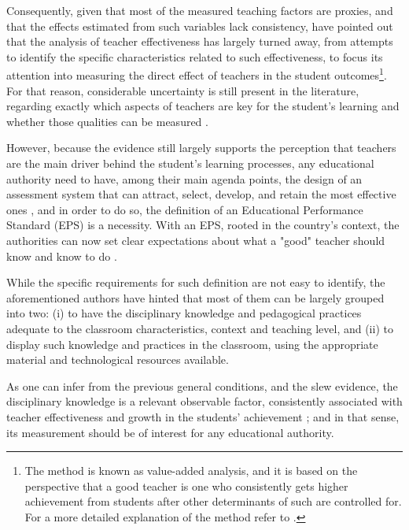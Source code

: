 Consequently, given that most of the measured teaching factors are proxies, and that the effects estimated from such variables lack consistency, \citet{Hanushek_et_al_2012} have pointed out that the analysis of teacher effectiveness has largely turned away, from attempts to identify the specific characteristics related to such effectiveness, to focus its attention into measuring the direct effect of teachers in the student outcomes\footnote{The method is known as value-added analysis, and it is based on the perspective that a good teacher is one who consistently gets higher achievement from students after other determinants of such are controlled for. For a more detailed explanation of the method refer to \citet{Scherrer_2011}.}. For that reason, considerable uncertainty is still present in the literature, regarding exactly which aspects of teachers are key for the student's learning and whether those qualities can be measured \cite{Rockoff_2004, Clotfelter_et_al_2006}.

However, because the evidence still largely supports the perception that teachers are the main driver behind the student's learning processes, any educational authority need to have, among their main agenda points, the design of an assessment system that can attract, select, develop, and retain the most effective ones \cite{Elacqua_et_al_2018}, and in order to do so, the definition of an Educational Performance Standard (EPS) is a necessity. With an EPS, rooted in the country's context, the authorities can now set clear expectations about what a "good" teacher should know and know to do \cite{Hincapie_et_al_2020}. 

While the specific requirements for such definition are not easy to identify, the aforementioned authors have hinted that most of them can be largely grouped into two: (i) to have the disciplinary knowledge and pedagogical practices adequate to the classroom characteristics, context and teaching level, and (ii) to display such knowledge and practices in the classroom, using the appropriate material and technological resources available. 

As one can infer from the previous general conditions, and the slew evidence, the disciplinary knowledge is a relevant observable factor, consistently associated with teacher effectiveness and growth in the students' achievement \cite{Santibanez_2006, Clotfelter_et_al_2006, Clotfelter_et_al_2007, Hanushek_et_al_2006, Marshall_2009, Rockoff_et_al_2011, Kane_et_al_2011, Kane_et_al_2012, Ome_2012, Metzler_et_al_2012, Kane_et_al_2013, Araujo_et_al_2016, Bietenbeck_et_al_2018, Estrada_2019}; and in that sense, its measurement should be of interest for any educational authority.

